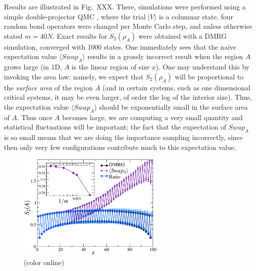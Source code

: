 \documentclass[prl,aps,twocolumn,floatfix,amsmath,amssymb,superscriptaddress,tightenlines]{revtex4}
\begin{document}
Results are illustrated in Fig.~XXX.  There, simulations were performed using a simple double-projector QMC \cite{Sandvik}, where
the trial $| V \rangle$ is a columnar state, four random bond operators were changed per Monte Carlo step, and unless otherwise
stated $m=40N$.  Exact results for $S_2(\rho_A)$ were obtained with a DMRG simulation, converged with 1000 states.  One 
immediately sees that the naive expectation value $\langle Swap_A \rangle$ results in a grossly incorrect result when the region
$A$ grows large (in 1D, $A$ is the linear region of size $x$).   
One may understand this by invoking the area law: namely,
we expect
that $S_2(\rho_A)$ will be proportional to the {\it surface area} of the region
$A$ (and in certain systems, such as one dimensional critical systems, it
may be even larger, of order the log of the interior size).  Thus,
the expectation value $\langle Swap_A \rangle$ should be exponentially small in the
surface area of $A$.  Thus once $A$ becomes
large, we are computing a very small quantity and
statistical fluctuations will be important;
the fact that the expectation
of $Swap_A$ is so small means that we are doing the importance sampling
incorrectly, since then only very few configurations contribute much to this
expectation value.

\begin{figure} {
\includegraphics[width=2.8in]{L100_fig2.eps} \caption{(color online) 
\label{1Dfig}
}
} \end{figure}
\end{document}
